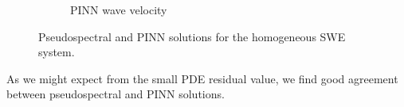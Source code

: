 \begin{figure}[h]
\begin{subfigure}[b]{0.45\textwidth}
        \caption{PINN wave velocity}
        \label{fig:homogeneous_pinn_swe_velocity}
    \end{subfigure}
    \caption{Pseudospectral and PINN solutions for the homogeneous SWE system.}
    \label{fig:homogeneous_swe_solution}
\end{figure}

As we might expect from the small PDE residual value, we find good agreement between pseudospectral and PINN solutions.